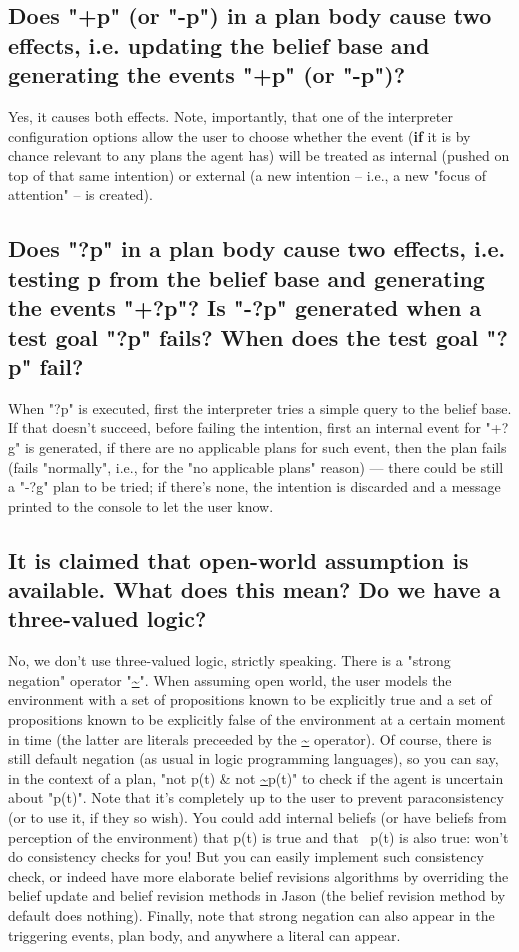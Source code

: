 \documentclass{article}
\newcommand{\jason}[0]{\htlink{\textit{Jason}}{http://jason.sf.net}\xspace}
\begin{document}
\begin{description}
\subsection{Does "+p" (or "-p") in a plan body cause two effects,
  i.e. updating the belief base and generating the events "+p" (or "-p")?}

Yes, it causes both effects. Note, importantly, that one of the
interpreter configuration options allow the user to choose whether the
event (\textbf{if} it is by chance relevant to any plans the agent
has) will be treated as internal (pushed on top of that same
intention) or external (a new intention -- i.e., a new "focus of
attention" -- is created).

\subsection{Does "?p" in a plan body cause two effects, i.e. testing p
from the belief base and generating the events "+?p"? Is "-?p"
  generated when a test goal "?p" fails? When does the test goal
  "?p" fail?}

When "?p" is executed, first the interpreter tries a simple query to
the belief base. If that doesn't succeed, before failing the
intention, first an internal event for "+?g" is generated, if there
are no applicable plans for such event, then the plan fails (fails
"normally", i.e., for the "no applicable plans" reason) --- there
could be still a "-?g" plan to be tried; if there's none, the
intention is discarded and a message printed to the console to let the
user know.

\subsection{It is claimed that open-world assumption is available. What
does this mean? Do we have a three-valued logic?}

No, we don't use three-valued logic, strictly speaking. There is a
"strong negation" operator "\url{~}". When assuming open world, the
user models the environment with a set of propositions known to be
explicitly true and a set of propositions known to be explicitly false
of the environment at a certain moment in time (the latter are
literals preceeded by the \url{~} operator).  Of course, there is
still default negation (as usual in logic programming languages), so
you can say, in the context of a plan, "not p(t) \& not \url{~}p(t)"
to check if the agent is uncertain about "p(t)". Note that it's
completely up to the user to prevent paraconsistency (or to use it, if
they so wish). You could add internal beliefs (or have beliefs from
perception of the environment) that p(t) is true and that ~p(t) is
also true: \jason won't do consistency checks for you! But you can
easily implement such consistency check, or indeed have more elaborate
belief revisions algorithms by overriding the belief update and belief
revision methods in Jason (the belief revision method by default does
nothing). Finally, note that strong negation can also appear in the
triggering events, plan body, and anywhere a literal can appear.



\end{description}
\end{document}

